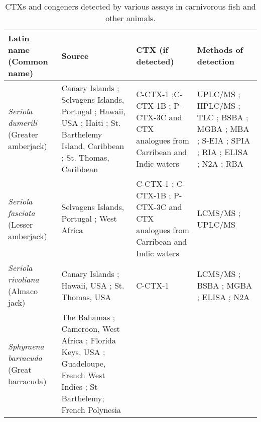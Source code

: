 \documentclass[12pt]{article}
\begin{document}
\FloatBarrier
\begin{longtable}{  | p{3cm} | p{4.5cm} | p{2.95cm} | p{3.95cm} | }
\caption{CTXs and congeners detected by various assays in carnivorous fish and other animals.}\\
\hline
\textbf{Latin name (Common name)} & \textbf{Source} & \textbf{CTX (if detected)} & \textbf{Methods of detection} \\
\hline
 \emph{Seriola dumerili} (Greater amberjack) & Canary Islands \cite{caillaud2012towards}; Selvagens Islands, Portugal \cite{otero2010first}; Hawaii, USA \cite{campora2008detection,hokama1977radioimmunoassay,hokama1983rapid,hokama1985rapid}; Haiti \cite{poli1997identification}; St. Barthelemy Island, Caribbean \cite{vernoux1986heterogeneity}; St. Thomas, Caribbean \cite{granade1976ciguatera} & C-CTX-1 \cite{poli1997identification};C-CTX-1B \cite{otero2010first}; P-CTX-3C and CTX analogues from Carribean and Indic waters \cite{otero2010first} & UPLC/MS \cite{otero2010first}; HPLC/MS \cite{poli1997identification}; TLC \cite{vernoux1986heterogeneity}; BSBA \cite{granade1976ciguatera}; MGBA \cite{campora2008detection,granade1976ciguatera}; MBA \cite{hokama1983rapid,hokama1985rapid,vernoux1986heterogeneity}; S-EIA \cite{hokama1985rapid}; SPIA \cite{otero2010first}; RIA \cite{campora2008detection,hokama1983rapid}; ELISA \cite{campora2008detection}; N2A \cite{caillaud2012towards,campora2008detection}; RBA \cite{} \\
\hline
 \emph{Seriola fasciata} (Lesser amberjack) & Selvagens Islands, Portugal \cite{otero2010first}; West Africa \cite{boada2010ciguatera} & C-CTX-1 \cite{boada2010ciguatera}; C-CTX-1B \cite{otero2010first}; P-CTX-3C and CTX analogues from Carribean and Indic waters \cite{otero2010first} & LCMS/MS \cite{boada2010ciguatera}; UPLC/MS \cite{otero2010first}\\
\hline
 \emph{Seriola rivoliana} (Almaco jack) & Canary Islands \cite{campora2010evaluating}; Hawaii, USA \cite{campora2008detection}; St. Thomas, USA \cite{granade1976ciguatera} & C-CTX-1 \cite{} & LCMS/MS \cite{}; BSBA \cite{granade1976ciguatera}; MGBA \cite{granade1976ciguatera}; ELISA \cite{campora2008detection,campora2010evaluating}; N2A \cite{campora2008detection,campora2010evaluating} \\
\hline
 \emph{Sphyraena barracuda} (Great barracuda) & The Bahamas \cite{}; Cameroon, West Africa \cite{}; Florida Keys, USA \cite{}; Guadeloupe, French West Indies \cite{}; St Barthelemy\cite{}; French Polynesia \cite{} &  & \\

\end{longtable}
\end{document}
